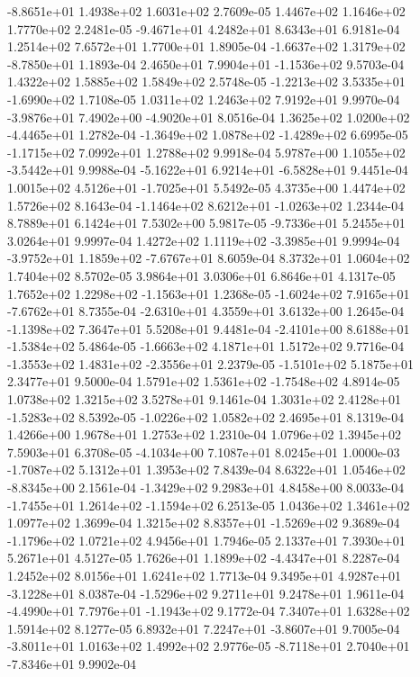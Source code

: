 -8.8651e+01  1.4938e+02  1.6031e+02  2.7609e-05
1.4467e+02 1.1646e+02 1.7770e+02  2.2481e-05
-9.4671e+01  4.2482e+01  8.6343e+01  6.9181e-04
1.2514e+02 7.6572e+01 1.7700e+01  1.8905e-04
-1.6637e+02  1.3179e+02 -8.7850e+01  1.1893e-04
 2.4650e+01  7.9904e+01 -1.1536e+02  9.5703e-04
1.4322e+02 1.5885e+02 1.5849e+02  2.5748e-05
-1.2213e+02  3.5335e+01 -1.6990e+02  1.7108e-05
1.0311e+02 1.2463e+02 7.9192e+01  9.9970e-04
-3.9876e+01  7.4902e+00 -4.9020e+01  8.0516e-04
 1.3625e+02  1.0200e+02 -4.4465e+01  1.2782e-04
-1.3649e+02  1.0878e+02 -1.4289e+02  6.6995e-05
-1.1715e+02  7.0992e+01  1.2788e+02  9.9918e-04
 5.9787e+00  1.1055e+02 -3.5442e+01  9.9988e-04
-5.1622e+01  6.9214e+01 -6.5828e+01  9.4451e-04
 1.0015e+02  4.5126e+01 -1.7025e+01  5.5492e-05
4.3735e+00 1.4474e+02 1.5726e+02  8.1643e-04
-1.1464e+02  8.6212e+01 -1.0263e+02  1.2344e-04
8.7889e+01 6.1424e+01 7.5302e+00  5.9817e-05
-9.7336e+01  5.2455e+01  3.0264e+01  9.9997e-04
 1.4272e+02  1.1119e+02 -3.3985e+01  9.9994e-04
-3.9752e+01  1.1859e+02 -7.6767e+01  8.6059e-04
8.3732e+01 1.0604e+02 1.7404e+02  8.5702e-05
3.9864e+01 3.0306e+01 6.8646e+01  4.1317e-05
 1.7652e+02  1.2298e+02 -1.1563e+01  1.2368e-05
-1.6024e+02  7.9165e+01 -7.6762e+01  8.7355e-04
-2.6310e+01  4.3559e+01  3.6132e+00  1.2645e-04
-1.1398e+02  7.3647e+01  5.5208e+01  9.4481e-04
-2.4101e+00  8.6188e+01 -1.5384e+02  5.4864e-05
-1.6663e+02  4.1871e+01  1.5172e+02  9.7716e-04
-1.3553e+02  1.4831e+02 -2.3556e+01  2.2379e-05
-1.5101e+02  5.1875e+01  2.3477e+01  9.5000e-04
 1.5791e+02  1.5361e+02 -1.7548e+02  4.8914e-05
1.0738e+02 1.3215e+02 3.5278e+01  9.1461e-04
 1.3031e+02  2.4128e+01 -1.5283e+02  8.5392e-05
-1.0226e+02  1.0582e+02  2.4695e+01  8.1319e-04
1.4266e+00 1.9678e+01 1.2753e+02  1.2310e-04
1.0796e+02 1.3945e+02 7.5903e+01  6.3708e-05
-4.1034e+00  7.1087e+01  8.0245e+01  1.0000e-03
-1.7087e+02  5.1312e+01  1.3953e+02  7.8439e-04
 8.6322e+01  1.0546e+02 -8.8345e+00  2.1561e-04
-1.3429e+02  9.2983e+01  4.8458e+00  8.0033e-04
-1.7455e+01  1.2614e+02 -1.1594e+02  6.2513e-05
1.0436e+02 1.3461e+02 1.0977e+02  1.3699e-04
 1.3215e+02  8.8357e+01 -1.5269e+02  9.3689e-04
-1.1796e+02  1.0721e+02  4.9456e+01  1.7946e-05
2.1337e+01 7.3930e+01 5.2671e+01  4.5127e-05
 1.7626e+01  1.1899e+02 -4.4347e+01  8.2287e-04
1.2452e+02 8.0156e+01 1.6241e+02  1.7713e-04
 9.3495e+01  4.9287e+01 -3.1228e+01  8.0387e-04
-1.5296e+02  9.2711e+01  9.2478e+01  1.9611e-04
-4.4990e+01  7.7976e+01 -1.1943e+02  9.1772e-04
7.3407e+01 1.6328e+02 1.5914e+02  8.1277e-05
 6.8932e+01  7.2247e+01 -3.8607e+01  9.7005e-04
-3.8011e+01  1.0163e+02  1.4992e+02  2.9776e-05
-8.7118e+01  2.7040e+01 -7.8346e+01  9.9902e-04
